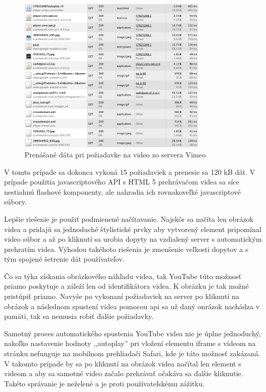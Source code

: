 \begin{figure}[H]
	\centering
	\includegraphics[width=0.8\textwidth]{img/vimeo.png}
	\caption[Prenášané dáta pri požiadavke na video zo servera Vimeo]{
		Prenášané dáta pri požiadavke na video zo servera Vimeo}
	\label{fig: vimeo}
\end{figure}

V tomto prípade sa dokonca vykoná 15 požiadaviek a prenesie sa 120 kB dát. V prípade použitia javascriptového API s HTML 5 prehrávačom videa sa síce nestiahnú flashové komponenty, ale nahradia ich rovnakoveľké javascriptové súbory.

Lepšie riešenie je použiť podmienené načítavanie. Najskôr sa načíta len obrázok videa a pridajú sa jednoduché štylistické prvky aby vytvorený element pripomínal video súbor a až po kliknutí sa urobia dopyty na vzdialený server s automatickým prehratím videa. Výhodou takéhoto riešenia je zmenšenie veľkosti dopytov a s tým spojené šetrenie dát používateľov. 

Čo sa týka získania obrázkového náhľadu videa, tak YouTube túto možnosť priamo poskytuje a záleží len od identifikátora videa. K obrázku je tak možné pristúpiť priamo. Navyše po vykonaní požiadaviek na server po kliknutí na obrázok a následnom spustení videa pomocou api sa už daný onrázok nachádza v pamäti, tak sa nemusia robiť ďalšie požiadavky. 

Samotný proces automatického spustenia YouTube videa nie je úplne jednoduchý, nakoľko nastavenie hodnoty ,,autoplay'' pri vložení elementu iframe s videom na stránku nefunguje na mobilnom prehliadači Safari, kde je táto možnosť zakázaná. V takomto prípade by sa po kliknutí na obrázok videa načítal len element s videom a aby sa samotné video začalo prehrávať očakáva sa ďalšie kliknutie. Takéto správanie je neželené a je proti používateľskému zážitku. 

